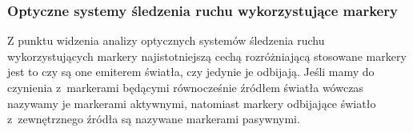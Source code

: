 \subsubsection*{Optyczne systemy śledzenia ruchu wykorzystujące markery}
Z punktu widzenia analizy optycznych systemów śledzenia ruchu wykorzystujących markery najistotniejszą cechą rozróżniającą stosowane markery jest to czy są one emiterem światła, czy jedynie je odbijają. Jeśli mamy do czynienia z~markerami będącymi równocześnie źródłem światła wówczas nazywamy je markerami aktywnymi, natomiast markery odbijające światło z~zewnętrznego źródła są nazywane markerami pasywnymi.

